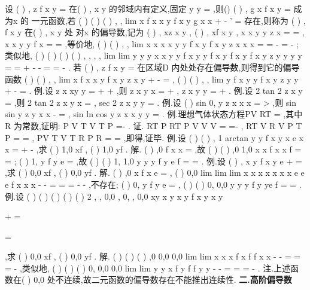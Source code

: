 设
(
)
,
z
f x y
=
在(
)
,
x
y
的邻域内有定义,固定
y
y
=
,则()
(
)
,
g x
f x y
=
成为x 的 
一元函数,若
(
)
(
)
(
)
,
,
lim
x
f x
x y
f x y
g x
x
\Delta \to 
+\Delta 
-
'
=
\Delta 
存在,则称为
(
)
,
f x y 在(
)
,
x
y
处 
对x 的\textcolor{lyred}{偏导数},记为
(
)
,
xz
x
y
,
(
)
,
xf
x
y
,
x x
y y
z
x
=
=
\partial 
\partial 
,
x x
y y
f
x
=
=
\partial 
\partial 
,等价地, 
(
)
(
)
,
,
lim
x
x
x x
y y
f x y
f x
y
z
x
x
x
\to 
=
=
-
\partial 
=
\partial 
-
; 
类似地,
(
)
(
)
(
)
(
)
,
,
,
,
lim
lim
y
y
y
x x
y y
f x
y
y
f x
y
f x
y
f x
y
z
y
y
y
y
\Delta \to 
\to 
=
=
+\Delta 
-
-
\partial 
=
=
\partial 
\Delta 
-
.\textcolor{lyred}{ }
若
(
)
,
z
f
x y
=
在区域D 内处处存在偏导数,则得到它的\textcolor{lyred}{偏导函数 }
(
)
(
)
,
,
lim
x
f x
x y
f x y
z
x
y
\Delta \to 
+\Delta 
-
\partial =
\partial 
\Delta 
,
(
)
(
)
,
,
lim
y
f x y
y
f x y
z
y
y
\Delta \to 
+\Delta 
-
\partial =
\partial 
\Delta 
. 
\textcolor{lyred}{例}.设
z
x
xy
y
=
+
+
,则
z
x
y
x
\partial =
+
\partial 
,
z
x
y
y
\partial =
+
\partial 
. 
\textcolor{lyred}{例}.设
2 tan 2
z
x
y
=
,则
2 tan 2
z
x
y
x
\partial =
\partial 
,
sec 2
z
x
y
y
\partial =
\partial 
. 
\textcolor{lyred}{例}.设
(
)
sin
0,
y
z
x
x
x
=
>
\neq 
,则
sin
sin
y
z
y x
x
-
\partial =
\cdots 
\partial 
,
sin ln
cos
y
z
x
x
y
y
\partial =
\cdots 
\partial 
. 
\textcolor{lyred}{例}.理想气体状态方程PV
RT
=
,其中R 为常数,证明:
P
V
T
V
T
P
\partial 
\partial 
\partial 
\cdots 
\cdots 
=-
\partial 
\partial 
\partial 
. 
证.
RT
P
RT
P
V
V
V
\partial 
=
\Rightarrow 
=-
\partial 
,
RT
V
R
V
P
T
P
\partial 
=
\Rightarrow 
=
\partial 
,
PV
T
V
T
R
P
R
\partial 
=
\Rightarrow 
=
\partial 
,即得,证毕. 
\textcolor{lyred}{例}.设
(
)
(
)
,
1 arctan
y
y
f x y
x e
x
x
=
+
-
,求
(
)
1,0
xf
,
(
)
1,0
yf
. 
解.
(
)
,0
f x
x
=
,故
(
)
(
)
,0
1,0
x
x
f
x
x
f
=
\Rightarrow 
=
; 
(
)
1,
y
f
y
e
=
,故
(
)
(
)
1,
1,0
y
y
y
f
y
e
f
=
\Rightarrow 
=
. 
\textcolor{lyred}{例}.设
(
)
,
x
y
f x y
e
+
=
,求
(
)
0,0
xf
,
(
)
0,0
yf
. 
解.
(
)
,0
x
f x
e
=
,
(
)
0,0
lim
lim
lim
x
x
x
x
x
x
x
e
e
e
f
x
x
x
\to 
\to 
\to 
-
-
=
=
=
-
-
,不存在; 
(
)
0,
y
f
y
e
=
,
(
)
(
)
0,
0,0
y
y
y
f
y
ye
f
=
\Rightarrow 
=
. 
\textcolor{lyred}{例}.设
(
)
(
)
(
)
(
)
(
)
2 ,
,
0,0
,
0,
,
0,0
xy
x y
x
y
f x y
x y

\neq 

+
=

=

,求
(
)
0,0
xf
,
(
)
0,0
yf
. 
解.
(
)
(
)
(
)
,0
0,0
0,0
lim
lim
x
x
x
f x
f
f
x
x
\to 
\to 
-
-
=
=
=
-
,类似地, 
(
)
(
)
(
)
0,
0,0
0,0
lim
lim
y
y
x
f
y
f
f
y
y
\to 
\to 
-
-
=
=
=
-
. 
\textcolor{lyred}{注}.上述函数在(
)
0,0 处不连续,故二元函数的偏导数存在不能推出连续性. 
\vspace{4pt}
{\bfseries \textcolor{lyred}{二.高阶偏导数}}

